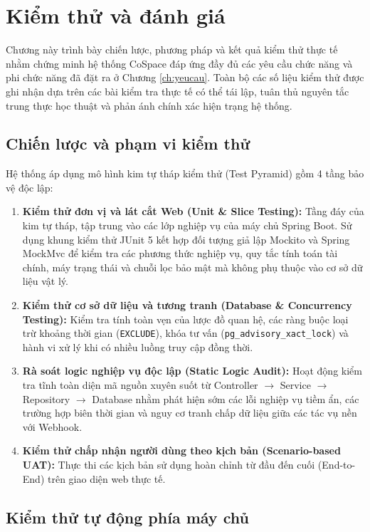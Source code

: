 \chapter{Kiểm thử và đánh giá}
\label{ch:kiemthu}

Chương này trình bày chiến lược, phương pháp và kết quả kiểm thử thực tế nhằm chứng minh hệ thống CoSpace đáp ứng đầy đủ các yêu cầu chức năng và phi chức năng đã đặt ra ở Chương \ref{ch:yeucau}. Toàn bộ các số liệu kiểm thử được ghi nhận dựa trên các bài kiểm tra thực tế có thể tái lập, tuân thủ nguyên tắc trung thực học thuật và phản ánh chính xác hiện trạng hệ thống.

\section{Chiến lược và phạm vi kiểm thử}
\label{sec:kt_chienluoc}

Hệ thống áp dụng mô hình kim tự tháp kiểm thử (Test Pyramid) \cite{vocke2018testpyramid} gồm 4 tầng bảo vệ độc lập:
\begin{enumerate}
    \item \textbf{Kiểm thử đơn vị và lát cắt Web (Unit \& Slice Testing):} Tầng đáy của kim tự tháp, tập trung vào các lớp nghiệp vụ của máy chủ Spring Boot. Sử dụng khung kiểm thử JUnit 5 kết hợp đối tượng giả lập Mockito và Spring MockMvc để kiểm tra các phương thức nghiệp vụ, quy tắc tính toán tài chính, máy trạng thái và chuỗi lọc bảo mật mà không phụ thuộc vào cơ sở dữ liệu vật lý.
    \item \textbf{Kiểm thử cơ sở dữ liệu và tương tranh (Database \& Concurrency Testing):} Kiểm tra tính toàn vẹn của lược đồ quan hệ, các ràng buộc loại trừ khoảng thời gian (\texttt{EXCLUDE}), khóa tư vấn (\texttt{pg\_advisory\_xact\_lock}) và hành vi xử lý khi có nhiều luồng truy cập đồng thời.
    \item \textbf{Rà soát logic nghiệp vụ độc lập (Static Logic Audit):} Hoạt động kiểm tra tĩnh toàn diện mã nguồn xuyên suốt từ Controller $\rightarrow$ Service $\rightarrow$ Repository $\rightarrow$ Database nhằm phát hiện sớm các lỗi nghiệp vụ tiềm ẩn, các trường hợp biên thời gian và nguy cơ tranh chấp dữ liệu giữa các tác vụ nền với Webhook.
    \item \textbf{Kiểm thử chấp nhận người dùng theo kịch bản (Scenario-based UAT):} Thực thi các kịch bản sử dụng hoàn chỉnh từ đầu đến cuối (End-to-End) trên giao diện web thực tế.
\end{enumerate}

\section{Kiểm thử tự động phía máy chủ}
\label{sec:kt_be}

